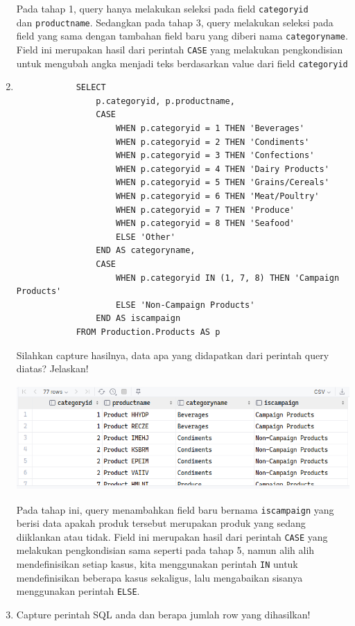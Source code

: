 \documentclass[12pt,titlepage]{article}
\begin{document}
\begin{enumerate}
{        Pada tahap 1, query hanya melakukan seleksi pada field \texttt{categoryid} \\dan \texttt{productname}.
        Sedangkan pada tahap 3, query melakukan seleksi pada field yang sama dengan tambahan field baru yang diberi nama
        \texttt{categoryname}. Field ini merupakan hasil dari perintah \texttt{CASE} yang melakukan pengkondisian
        untuk mengubah angka menjadi teks berdasarkan value dari field \texttt{categoryid}
    }
    \item {
        \begin{verbatim}
            SELECT
                p.categoryid, p.productname,
                CASE
                    WHEN p.categoryid = 1 THEN 'Beverages'
                    WHEN p.categoryid = 2 THEN 'Condiments'
                    WHEN p.categoryid = 3 THEN 'Confections'
                    WHEN p.categoryid = 4 THEN 'Dairy Products'
                    WHEN p.categoryid = 5 THEN 'Grains/Cereals'
                    WHEN p.categoryid = 6 THEN 'Meat/Poultry'
                    WHEN p.categoryid = 7 THEN 'Produce'
                    WHEN p.categoryid = 8 THEN 'Seafood'
                    ELSE 'Other'
                END AS categoryname,
                CASE
                    WHEN p.categoryid IN (1, 7, 8) THEN 'Campaign Products'
                    ELSE 'Non-Campaign Products'
                END AS iscampaign
            FROM Production.Products AS p
        \end{verbatim}

        Silahkan capture hasilnya, data apa yang didapatkan dari perintah query diatas? Jelaskan!

        \begin{center}
            \includegraphics[height=4cm]{./images/p4-n2.png}\\
        \end{center}

        Pada tahap ini, query menambahkan field baru bernama \texttt{iscampaign} yang berisi data apakah produk tersebut merupakan
        produk yang sedang diiklankan atau tidak. Field ini merupakan hasil dari perintah \texttt{CASE} yang melakukan pengkondisian
        sama seperti pada tahap 5, namun alih alih mendefinisikan setiap kasus, kita menggunakan perintah \texttt{IN} untuk mendefinisikan
        beberapa kasus sekaligus, lalu mengabaikan sisanya menggunakan perintah \texttt{ELSE}.
    }
    \item {
        Capture perintah SQL anda dan berapa jumlah row yang dihasilkan!

}
\end{enumerate}
\end{document}
